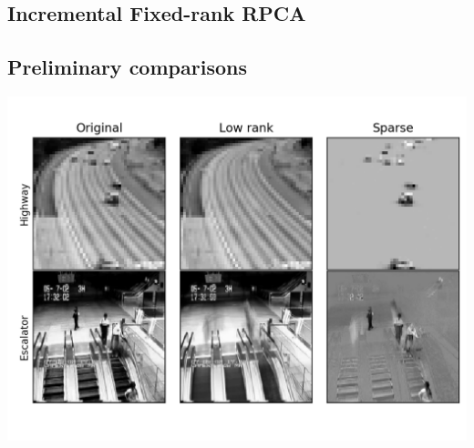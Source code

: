\documentclass[oneside]{article}
\begin{document}
 \subsection{Incremental Fixed-rank RPCA}
\subsection{Preliminary comparisons}
\includegraphics[scale=0.5]{montage_fpcp.png}
\end{document}
